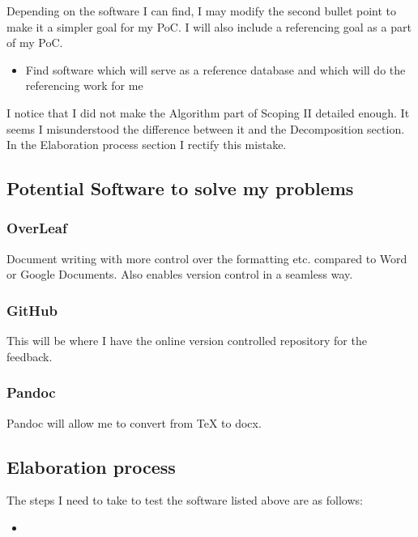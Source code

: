 \documentclass{article}
\begin{document}
\noindent
Depending on the software I can find, I may modify the second bullet point to make it a simpler goal for my PoC. I will also include a referencing goal as a part of my PoC.

\begin{itemize}
    \item Find software which will serve as a reference database and which will do the referencing work for me 
\end{itemize}


\noindent
I notice that I did not make the Algorithm part of Scoping II detailed enough. It seems I misunderstood the difference between it and the Decomposition section. In the Elaboration process section I rectify this mistake.


\subsection{Potential Software to solve my problems}

\subsubsection{OverLeaf}

Document writing with more control over the formatting etc. compared to Word or Google Documents. Also enables version control in a seamless way.

\subsubsection{GitHub}

This will be where I have the online version controlled repository for the feedback.

\subsubsection{Pandoc}

Pandoc will allow me to convert from TeX to docx.


\subsection{Elaboration process}

The steps I need to take to test the software listed above are as follows:

\begin{itemize}
    \item 
\end{itemize}
\end{document}
